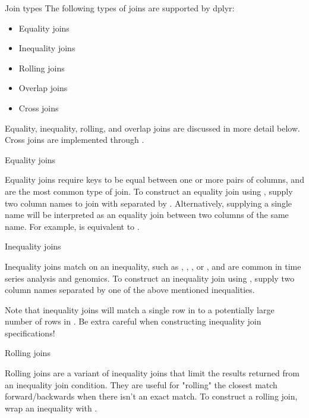 \documentclass[a4paper]{book}
\begin{document}
\begin{Section}{Join types}
The following types of joins are supported by dplyr:
\begin{itemize}

\item{} Equality joins
\item{} Inequality joins
\item{} Rolling joins
\item{} Overlap joins
\item{} Cross joins

\end{itemize}


Equality, inequality, rolling, and overlap joins are discussed in more detail
below. Cross joins are implemented through .
%
\begin{SubSection}{Equality joins}

Equality joins require keys to be equal between one or more pairs of columns,
and are the most common type of join. To construct an equality join using
, supply two column names to join with separated by \code{==}.
Alternatively, supplying a single name will be interpreted as an equality
join between two columns of the same name. For example,  is
equivalent to .
\end{SubSection}


%
\begin{SubSection}{Inequality joins}

Inequality joins match on an inequality, such as \code{>}, \code{>=}, \code{<}, or \code{<=}, and
are common in time series analysis and genomics. To construct an inequality
join using , supply two column names separated by one of the above
mentioned inequalities.

Note that inequality joins will match a single row in  to a potentially
large number of rows in . Be extra careful when constructing inequality
join specifications!
\end{SubSection}


%
\begin{SubSection}{Rolling joins}

Rolling joins are a variant of inequality joins that limit the results
returned from an inequality join condition. They are useful for "rolling" the
closest match forward/backwards when there isn't an exact match. To construct
a rolling join, wrap an inequality with .
\begin{itemize}


\end{itemize}
\end{SubSection}
\end{Section}
\end{document}
